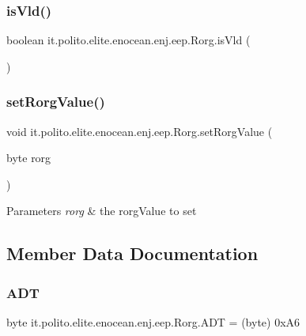 \subsubsection{\texorpdfstring{is\+Vld()}{isVld()}}
{\footnotesize\ttfamily boolean it.\+polito.\+elite.\+enocean.\+enj.\+eep.\+Rorg.\+is\+Vld (\begin{DoxyParamCaption}{ }\end{DoxyParamCaption})}

\hypertarget{classit_1_1polito_1_1elite_1_1enocean_1_1enj_1_1eep_1_1_rorg_a94c64d248ad2e2a44ee733b0c437abad}{}\label{classit_1_1polito_1_1elite_1_1enocean_1_1enj_1_1eep_1_1_rorg_a94c64d248ad2e2a44ee733b0c437abad} 
\subsubsection{\texorpdfstring{set\+Rorg\+Value()}{setRorgValue()}}
{\footnotesize\ttfamily void it.\+polito.\+elite.\+enocean.\+enj.\+eep.\+Rorg.\+set\+Rorg\+Value (\begin{DoxyParamCaption}\item[{byte}]{rorg }\end{DoxyParamCaption})}


\begin{DoxyParams}{Parameters}
{\em rorg} & the rorg\+Value to set \\
\hline
\end{DoxyParams}


\subsection{Member Data Documentation}
\hypertarget{classit_1_1polito_1_1elite_1_1enocean_1_1enj_1_1eep_1_1_rorg_afd2d53a82ba5e01727766663ee756881}{}\label{classit_1_1polito_1_1elite_1_1enocean_1_1enj_1_1eep_1_1_rorg_afd2d53a82ba5e01727766663ee756881} 
\subsubsection{\texorpdfstring{A\+DT}{ADT}}
{\footnotesize\ttfamily byte it.\+polito.\+elite.\+enocean.\+enj.\+eep.\+Rorg.\+A\+DT = (byte) 0x\+A6\hspace{0.3cm}{\ttfamily [static]}}

